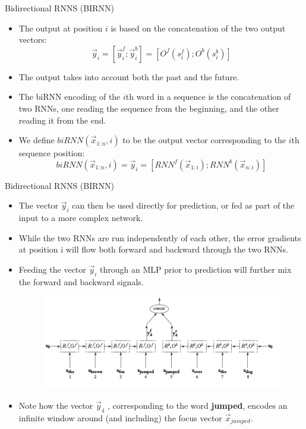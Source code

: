 \documentclass[handout]{beamer}
\begin{document}
\begin{frame}{Bidirectional RNNS (BIRNN)}
\begin{scriptsize}
\begin{itemize}
\item The output at position $i$ is based on the concatenation of the two output vectors:
\begin{displaymath}
\vec{y}_i = [\vec{y}_{i}^{f};\vec{y}_{i}^{b}]=[O^{f}(s_{i}^{f});O^{b}(s_{i}^{b})
]
\end{displaymath}
\item The output takes into account both the past and the future.
\item The biRNN encoding of the $i$th word in a sequence is the concatenation of two RNNs, one reading the sequence from the beginning, and the other reading it from the end.
\item We define $biRNN(\vec{x}_{1:n}, i)$ to be the output vector corresponding to the $i$th sequence position:
\begin{displaymath}
biRNN(\vec{x}_{1:n}, i) = \vec{y}_i = [RNN^{f}(\vec{x}_{1:i});RNN^{b}(\vec{x}_{n:i})]
\end{displaymath}
\end{itemize}
\end{scriptsize}
\end{frame}


\begin{frame}{Bidirectional RNNS (BIRNN)}
\begin{scriptsize}
\begin{itemize}
\item The vector $\vec{y}_i$ can then be used directly for prediction, or fed as part of the input to a more complex network.
\item While the two RNNs are run independently of each other, the error gradients
at position i will flow both forward and backward through the two RNNs.
\item Feeding the vector $\vec{y}_i$ through an MLP prior to prediction will further mix the forward and backward signals.
  \begin{figure}[h]
        	\includegraphics[scale = 0.35]{pics/biRNN.png}
        \end{figure}

\item Note how the vector $\vec{y}_4$ , corresponding to the word \textbf{jumped}, encodes an infinite window around (and including) the focus vector $\vec{x}_{jumped}$.        
\end{itemize}
\end{scriptsize}
\end{frame}
\end{document}
